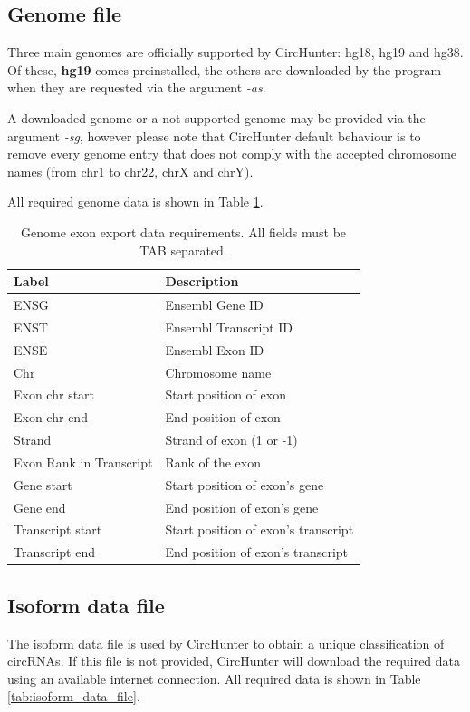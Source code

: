 \documentclass[letterpaper,12pt]{article}
\begin{document}
\subsection{Genome file}
Three main genomes are officially supported by CircHunter: hg18, hg19 and hg38. Of these, \textbf{hg19} comes preinstalled, the others are downloaded by the program when they are requested via the argument \textit{-as}.

A downloaded genome or a not supported genome may be provided via the argument \textit{-sg}, however please note that CircHunter default behaviour is to remove every genome entry that does not comply with the accepted chromosome names (from chr1 to chr22, chrX and chrY).

All required genome data is shown in Table \ref{tab:genome_file}.

\begin{table}[h]
  \centering
  \begin{tabular}{l | p{7cm}}
    Label & Description\\
    \hline \hline
    ENSG & Ensembl Gene ID \\
    ENST & Ensembl Transcript ID \\
    ENSE & Ensembl Exon ID \\
    Chr & Chromosome name \\
    Exon chr start & Start position of exon \\
    Exon chr end & End position of exon \\
    Strand & Strand of exon (1 or -1) \\
    Exon Rank in Transcript & Rank of the exon \\
    Gene start & Start position of exon's gene \\
    Gene end & End position of exon's gene \\
    Transcript start & Start position of exon's transcript \\
    Transcript end & End position of exon's transcript \\
  \end{tabular}
  \caption{Genome exon export data requirements. All fields must be TAB separated.}
  \label{tab:genome_file}
\end{table}

\subsection{Isoform data file}

The isoform data file is used by CircHunter to obtain a unique classification of circRNAs. If this file is not provided, CircHunter will download the required data using an available internet connection. All required data is shown in Table \ref{tab:isoform_data_file}.
\end{document}
